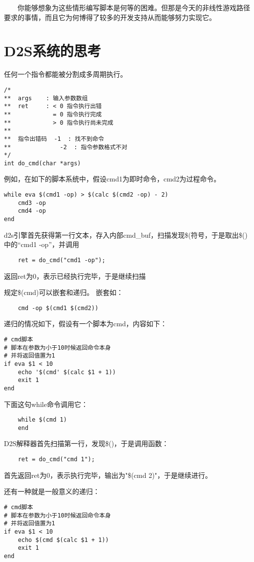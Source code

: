 　　你能够想象为这些情形编写脚本是何等的困难。但那是今天的非线性游戏路径要求的事情，而且它为何博得了较多的开发支持从而能够努力实现它。

\newpage

\section{D2S系统的思考}

任何一个指令都能被分割成多周期执行。

\begin{lstlisting}
/*
**  args    : 输入参数数组
**  ret     : < 0 指令执行出错
**            = 0 指令执行完成
**            > 0 指令执行尚未完成
**
**  指令出错码  -1  : 找不到命令
**              -2  : 指令参数格式不对
*/
int do_cmd(char *args)
\end{lstlisting}

例如，在如下的脚本系统中，假设cmd1为即时命令，cmd2为过程命令。
\begin{lstlisting}
while eva $(cmd1 -op) > $(calc $(cmd2 -op) - 2)
    cmd3 -op
    cmd4 -op
end
\end{lstlisting}
d2s引擎首先获得第一行文本，存入内部cmd\_buf，扫描发现\$(符号，于是取出\$()中的“cmd1 -op”，并调用
\begin{lstlisting}
    ret = do_cmd("cmd1 -op");
\end{lstlisting}
返回ret为0，表示已经执行完毕，于是继续扫描

规定\$(cmd)可以嵌套和递归。
嵌套如：
\begin{lstlisting}
    cmd -op $(cmd1 $(cmd2))
\end{lstlisting}
递归的情况如下，假设有一个脚本为cmd，内容如下：
\begin{lstlisting}
# cmd脚本
# 脚本在参数为小于10时候返回命令本身
# 并将返回值置为1
if eva $1 < 10
    echo '$(cmd' $(calc $1 + 1))
    exit 1
end
\end{lstlisting}
下面这句while命令调用它：
\begin{lstlisting}
    while $(cmd 1)
    end
\end{lstlisting}

D2S解释器首先扫描第一行，发现\$()，于是调用函数：
\begin{lstlisting}
    ret = do_cmd("cmd 1");
\end{lstlisting}
首先返回ret为0，表示执行完毕，输出为"\$(cmd 2)"，于是继续进行。

还有一种就是一般意义的递归：
\begin{lstlisting}
# cmd脚本
# 脚本在参数为小于10时候返回命令本身
# 并将返回值置为1
if eva $1 < 10
    echo $(cmd $(calc $1 + 1))
    exit 1
end
\end{lstlisting}

